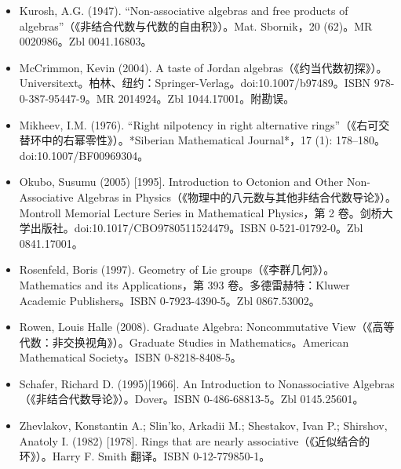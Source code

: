\begin{itemize}
\item Kurosh, A.G. (1947). “Non-associative algebras and free products of algebras”（《非结合代数与代数的自由积》）。Mat. Sbornik，20 (62)。MR 0020986。Zbl 0041.16803。
\item McCrimmon, Kevin (2004). A taste of Jordan algebras（《约当代数初探》）。Universitext。柏林、纽约：Springer-Verlag。doi:10.1007/b97489。ISBN 978-0-387-95447-9。MR 2014924。Zbl 1044.17001。附勘误。
\item Mikheev, I.M. (1976). “Right nilpotency in right alternative rings”（《右可交替环中的右幂零性》）。*Siberian Mathematical Journal*，17 (1): 178–180。doi:10.1007/BF00969304。
\item Okubo, Susumu (2005) [1995]. Introduction to Octonion and Other Non-Associative Algebras in Physics（《物理中的八元数与其他非结合代数导论》）。Montroll Memorial Lecture Series in Mathematical Physics，第 2 卷。剑桥大学出版社。doi:10.1017/CBO9780511524479。ISBN 0-521-01792-0。Zbl 0841.17001。
\item Rosenfeld, Boris (1997). Geometry of Lie groups（《李群几何》）。Mathematics and its Applications，第 393 卷。多德雷赫特：Kluwer Academic Publishers。ISBN 0-7923-4390-5。Zbl 0867.53002。
\item Rowen, Louis Halle (2008). Graduate Algebra: Noncommutative View（《高等代数：非交换视角》）。Graduate Studies in Mathematics。American Mathematical Society。ISBN 0-8218-8408-5。
\item Schafer, Richard D. (1995)[1966]. An Introduction to Nonassociative Algebras（《非结合代数导论》）。Dover。ISBN 0-486-68813-5。Zbl 0145.25601。
\item Zhevlakov, Konstantin A.; Slin'ko, Arkadii M.; Shestakov, Ivan P.; Shirshov, Anatoly I. (1982) [1978]. Rings that are nearly associative（《近似结合的环》）。Harry F. Smith 翻译。ISBN 0-12-779850-1。
\end{itemize}